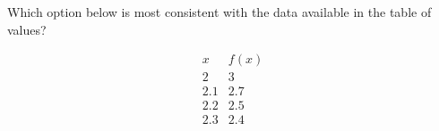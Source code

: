 \documentclass{ximera}
\author{Steven Gubkin}
\begin{document}
\begin{exercise}

Which option below is most consistent with the data available in the table of values?

\[
\begin{array}{c|c}
 x & f(x)\\ \hline
 2 & 3\\ 
 2.1 & 2.7 \\
 2.2 & 2.5\\ 
 2.3 & 2.4\\ 
\end{array}
\]

\begin{multipleChoice}
\end{multipleChoice}

\end{exercise}
\end{document}
